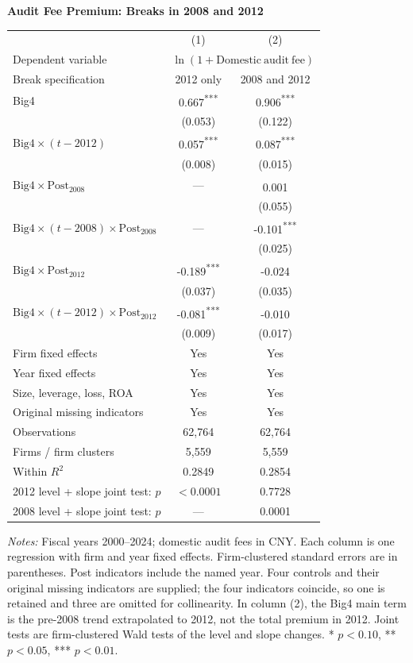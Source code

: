 \documentclass[10pt]{article}
\newcommand{\sym}[1]{\textsuperscript{#1}}
\begin{document}
\fontsize{10}{12}\selectfont\setlength{\parindent}{0pt}
\noindent\textbf{Audit Fee Premium: Breaks in 2008 and 2012}\par\medskip
\setlength{\tabcolsep}{3pt}\renewcommand{\arraystretch}{1.15}
\noindent\begin{tabular*}{\textwidth}{@{\extracolsep{\fill}}lcc@{}}
\toprule
 & (1) & (2) \\
Dependent variable & \multicolumn{2}{c}{\(\ln(1+\mathrm{Domestic\ audit\ fee})\)} \\
Break specification & 2012 only & 2008 and 2012 \\
\midrule
Big4 & 0.667\sym{***} & 0.906\sym{***} \\
 & (0.053) & (0.122) \\
\(\mathrm{Big4}\times(t-2012)\) & 0.057\sym{***} & 0.087\sym{***} \\
 & (0.008) & (0.015) \\
\(\mathrm{Big4}\times\mathrm{Post}_{2008}\) & --- & 0.001\sym{} \\
 &  & (0.055) \\
\(\mathrm{Big4}\times(t-2008)\times\mathrm{Post}_{2008}\) & --- & -0.101\sym{***} \\
 &  & (0.025) \\
\(\mathrm{Big4}\times\mathrm{Post}_{2012}\) & -0.189\sym{***} & -0.024\sym{} \\
 & (0.037) & (0.035) \\
\(\mathrm{Big4}\times(t-2012)\times\mathrm{Post}_{2012}\) & -0.081\sym{***} & -0.010\sym{} \\
 & (0.009) & (0.017) \\
\addlinespace
Firm fixed effects & Yes & Yes \\
Year fixed effects & Yes & Yes \\
Size, leverage, loss, ROA & Yes & Yes \\
Original missing indicators & Yes & Yes \\
Observations & 62,764 & 62,764 \\
Firms / firm clusters & 5,559 & 5,559 \\
Within \(R^2\) & 0.2849 & 0.2854 \\
\midrule
2012 level + slope joint test: \(p\) & \(<0.0001\) & 0.7728 \\
2008 level + slope joint test: \(p\) & --- & 0.0001 \\
\bottomrule
\end{tabular*}
\par\medskip\fontsize{9}{11}\selectfont\textit{Notes:} Fiscal years 2000--2024; domestic audit fees in CNY. Each column is one regression with firm and year fixed effects. Firm-clustered standard errors are in parentheses. Post indicators include the named year. Four controls and their original missing indicators are supplied; the four indicators coincide, so one is retained and three are omitted for collinearity. In column (2), the Big4 main term is the pre-2008 trend extrapolated to 2012, not the total premium in 2012. Joint tests are firm-clustered Wald tests of the level and slope changes. * \(p<0.10\), ** \(p<0.05\), *** \(p<0.01\).
\end{document}
